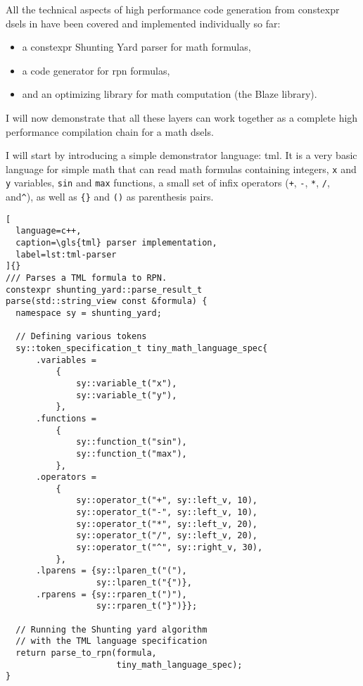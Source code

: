 \documentclass[../main]{subfiles}
\begin{document}
All the technical aspects of high performance code generation from
\gls{constexpr} \glspl{dsel} in  have been covered and implemented
individually so far:

\begin{itemize}
\item a \gls{constexpr} Shunting Yard parser for math formulas,
\item a code generator for \gls{rpn} formulas,
\item and an optimizing library for math computation (the Blaze library).
\end{itemize}

I will now demonstrate that all these layers can work together
as a complete high performance compilation chain for a math \glspl{dsel}.

I will start by introducing a simple demonstrator language: \gls{tml}.
It is a very basic language for simple math that can read math formulas
containing integers, \lstinline{x} and \lstinline{y} variables,
\lstinline{sin} and \lstinline{max} functions, a small set of infix operators
(\lstinline{+}, \lstinline{-}, \lstinline{*}, \lstinline{/}, and\lstinline{^}),
as well as \lstinline|{}| and \lstinline{()} as parenthesis pairs.

\begin{lstlisting}[
  language=c++,
  caption=\gls{tml} parser implementation,
  label=lst:tml-parser
]{}
/// Parses a TML formula to RPN.
constexpr shunting_yard::parse_result_t
parse(std::string_view const &formula) {
  namespace sy = shunting_yard;

  // Defining various tokens
  sy::token_specification_t tiny_math_language_spec{
      .variables =
          {
              sy::variable_t("x"),
              sy::variable_t("y"),
          },
      .functions =
          {
              sy::function_t("sin"),
              sy::function_t("max"),
          },
      .operators =
          {
              sy::operator_t("+", sy::left_v, 10),
              sy::operator_t("-", sy::left_v, 10),
              sy::operator_t("*", sy::left_v, 20),
              sy::operator_t("/", sy::left_v, 20),
              sy::operator_t("^", sy::right_v, 30),
          },
      .lparens = {sy::lparen_t("("),
                  sy::lparen_t("{")},
      .rparens = {sy::rparen_t(")"),
                  sy::rparen_t("}")}};

  // Running the Shunting yard algorithm
  // with the TML language specification
  return parse_to_rpn(formula,
                      tiny_math_language_spec);
}
\end{lstlisting}
\end{document}
